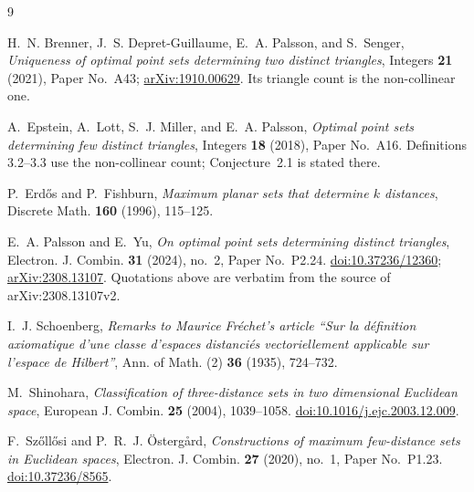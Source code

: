 \documentclass[11pt]{amsart}
\numberwithin{theorem}{section}
\theoremstyle{remark}
\theoremstyle{definition}
\begin{document}
\begin{thebibliography}{9}

H.~N. Brenner, J.~S. Depret-Guillaume, E.~A. Palsson, and S.~Senger,
\emph{Uniqueness of optimal point sets determining two distinct triangles},
Integers \textbf{21} (2021), Paper No.~A43;
\href{https://arxiv.org/abs/1910.00629}{arXiv:1910.00629}.
Its triangle count is the non-collinear one.

A.~Epstein, A.~Lott, S.~J. Miller, and E.~A. Palsson,
\emph{Optimal point sets determining few distinct triangles},
Integers \textbf{18} (2018), Paper No.~A16.
Definitions 3.2--3.3 use the non-collinear count; Conjecture~2.1 is stated
there.

P.~Erd\H{o}s and P.~Fishburn,
\emph{Maximum planar sets that determine $k$ distances},
Discrete Math. \textbf{160} (1996), 115--125.

E.~A. Palsson and E.~Yu,
\emph{On optimal point sets determining distinct triangles},
Electron. J. Combin. \textbf{31} (2024), no.~2, Paper No.~P2.24.
\href{https://doi.org/10.37236/12360}{doi:10.37236/12360};
\href{https://arxiv.org/abs/2308.13107}{arXiv:2308.13107}.
Quotations above are verbatim from the source of arXiv:2308.13107v2.

I.~J. Schoenberg,
\emph{Remarks to Maurice Fr\'echet's article ``Sur la d\'efinition axiomatique
d'une classe d'espaces distanci\'es vectoriellement applicable sur l'espace de
Hilbert''},
Ann. of Math. (2) \textbf{36} (1935), 724--732.

M.~Shinohara,
\emph{Classification of three-distance sets in two dimensional Euclidean
space},
European J. Combin. \textbf{25} (2004), 1039--1058.
\href{https://doi.org/10.1016/j.ejc.2003.12.009}{doi:10.1016/j.ejc.2003.12.009}.

F.~Sz\H{o}ll\H{o}si and P.~R.~J. \"Osterg\aa rd,
\emph{Constructions of maximum few-distance sets in Euclidean spaces},
Electron. J. Combin. \textbf{27} (2020), no.~1, Paper No.~P1.23.
\href{https://doi.org/10.37236/8565}{doi:10.37236/8565}.

\end{thebibliography}
\end{document}
